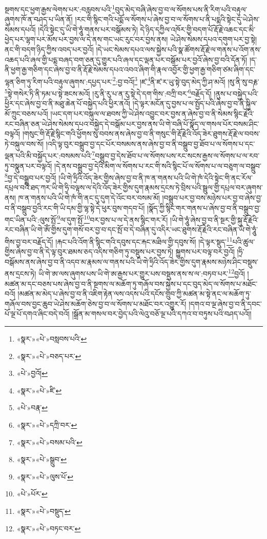 སྔགས་དང་ཕྱག་རྒྱས་ལེགས་པར་:བརླབས་པའི་\footnote{«སྣར་»«པེ་»བསླབས་པའི་}བུད་མེད་བཞི་ཞེས་བྱ་བ་ལ་སོགས་པས་ནི་རིག་པའི་བརྟུལ་ཞུགས་ཁོ་ན་བཤད་པ་ཡིན་ནོ། །རང་གི་སྙིང་གའི་པདྨོ་ལ་སོགས་པ་ཞེས་བྱ་བ་ལ་སོགས་པ་ནི་པདྨའི་སྟེང་དུ་ཡེ་ཤེས་སེམས་དཔའོ། །དེའི་སྟེང་དུ་ཡི་གེ་ཧཱུཾ་གནས་པར་བསྒོམས་ཏེ། དེ་ཉིད་དཀྱིལ་འཁོར་གྱི་བདག་པོ་རྡོ་རྗེ་འཆང་དང་མི་ཕྱེད་པར་ལྷག་པར་མོས་པར་བྱས་ལ་དེ་ནས་གང་ཡང་རུང་བར་བྱས་ནས། ཡེ་ཤེས་སེམས་དཔའ་དགུག་པར་བྱ་སྟེ། ནང་གི་བདག་ཉིད་ཀྱིས་འབད་པར་བྱའོ། །དེ་ཡང་སེམས་དཔའ་ལས་སྐྱེས་པའི་སྣ་ཚོགས་རྡོ་རྗེ་ལ་གནས་པ་འོག་ནས་འཆད་པའི་ཞལ་གྱི་པདྨ་བཞད་བག་ཅན་དུ་གྱུར་པའི་ཞལ་དང་ལྡན་པར་བསྒོམ་པར་བྱའོ་ཞེས་བྱ་བའི་དོན་ཏོ། །ད་ནི་ཕྱག་རྒྱ་གཅིག་དང་ཞེས་བྱ་བ་ནི་རྡོ་རྗེ་སེམས་དཔའ་འབའ་ཞིག་གི་རྣལ་འབྱོར་གྱི་ཕྱག་རྒྱ་གཅིག་ཙམ་ཞིག་དང་ལྷན་ཅིག་ཏུ་རིག་པའི་བརྟུལ་ཞུགས་:དཔྱད་པར་\footnote{«སྣར་»«པེ་»བཅད་པར་}:བྱ་བའོ།\footnote{«པེ་»བྱའོ།} །ཛ་\footnote{«སྣར་»«པེ་»ཛི་}ནི་ཛ་ར་ཡུ་སྟེ་བུད་མེད་ཀྱི་ཤ་མའོ། །སུ་ནི་སུ་བརྞ་\footnote{«པེ་»བརྣ་}སྟེ་གསེར་ཏི་ནི་ཏམ་པ་སྟེ་ཟངས་མའོ། །རུ་ནི་རུ་པ་ན་རུ་སྟེ་དེ་དག་གིས་:བཀྲི་བར་\footnote{«སྣར་»«པེ་»དཀྲི་བར་}བརྗོད་དོ། །ནུས་པ་བསྐྱེད་པའི་ཕྱིར་དང་ཞེས་བྱ་བ་ནི་མཐུ་ཆེན་པོ་བསྐྱེད་པའི་ཕྱིར་ནའོ། །དེ་ལྟར་མངོན་དུ་བྱས་པ་ལ་སྤྱོད་པའི་ཞེས་བྱ་བ་ནི་སྐྱིལ་མོ་ཀྲུང་བཅས་པའོ། །ཡང་དག་པར་བསྐུལ་ལ་ཐབས་ཀྱི་ཡེ་ཤེས་འབྱུང་བར་བྱས་ན་ཞེས་བྱ་བ་ནི་སེམས་སྙིང་རྗེའི་རང་བཞིན་ཅན་ཡེ་ཤེས་སེམས་དཔའ་བསྐྱེད་དེ་བསྒོམ་པར་བྱས་ནས་ཡི་གེ་བཞི་པོ་སྣོད་ལ་གསལ་པོར་བསམ་ཤིང་བལྟའོ། །གསུང་གི་རྡོ་རྗེ་སྙིང་གའི་ཕྱོགས་སུ་བབས་ནས་ཞེས་བྱ་བ་ནི་གསུང་གི་རྡོ་རྗེའི་འོད་ཟེར་ཐུགས་རྡོ་རྗེ་ལ་བབས་ཏེ་བསྐུལ་བས་སོ། །འདི་ལྟ་བུར་བསྒྲུབ་བྱ་དང་པོར་བསམས་ནས་ཞེས་བྱ་བ་ནི་བསྒྲུབ་བྱ་ཐོབ་པ་ལ་སོགས་པ་དང་ལྡན་པའི་མི་བསྐྱོད་པར་:བསམས་པའི་\footnote{«སྣར་»«པེ་»བསམ་པའི་}བསྒྲུབ་བྱ་དེས་ཐོབ་པ་ལ་སོགས་པས་རང་སངས་རྒྱས་ལ་སོགས་པ་ལ་རབ་ཏུ་བསྣུན་པར་བལྟའོ། །དེ་ནས་བསྒྲུབ་བྱ་དེའི་མིག་ལ་སོགས་པ་རང་གི་སའི་སྙིང་པོ་ལ་སོགས་པ་ལ་བཅུག་ལ་བསྒྲུབ་\footnote{«སྣར་»«པེ་»སྒྲུབ་}བྱ་དེ་བསྒྲུབ་པར་བྱའོ། །ཡི་གེ་ཧྲིའི་འོད་ཟེར་གྱིས་ཞེས་བྱ་བ་ནི་ཁ་ན་གནས་པའི་ཡི་གེ་ཁཾ་དེའི་སྟེང་གི་ནང་རོལ་དཔྲལ་བའི་ཐད་ཀར་ཡི་གེ་ཧྲི་བལྟས་ལ་དེའི་འོད་ཟེར་གྱིས་དུག་རྣམས་དྲངས་ཏེ་བྲིས་པའི་སྦྲུལ་གྱི་དཔྲལ་བར་ཞུགས་ནས། ཁ་ན་གནས་པའི་ཡི་གེ་ཁཾ་གི་ནང་དུ་དུག་དེ་འོང་བར་བསམ་མོ། །བསྒྲུབ་པར་བྱ་བས་མཉེས་པར་བྱ་བ་ཞེས་བྱ་བ་ནི་བསྒྲུབ་བྱའི་རང་གི་ཡི་དམ་གྱི་ལྷ་སྟེ་དེ་ཕུར་བུས་གདབ་པོ། །སྣོད་ཀྱི་སྙིང་གར་གནས་པ་ཞེས་བྱ་བ་ནི་བསྒྲུབ་བྱ་གང་ཡིན་པའི་:ལུས་སྤོ་\footnote{«སྣར་»«པེ་»ལུས་པོ་}ལ་དུག་སྤོ་\footnote{«པེ་»པོར་}བར་བྱས་པ་ལ་དེ་ནས་སྙིང་གར་རོ། །ཡི་གེ་ཧཱུཾ་ཞེས་བྱ་བ་ནི་སྔར་གྱི་སྐུ་རྡོ་རྗེའི་རང་བཞིན་ཡི་གེ་ཨོཾ་གྱིས་དུག་གསོ་བར་བྱ་བ་དང་སྤོ་བ་དེ་བཞིན་དུ་འདིར་ཡང་ཐུགས་རྡོ་རྗེའི་རང་བཞིན་ཡི་གེ་ཧཱུཾ་གིས་བྱ་བར་བརྗོད་དོ། །རྐང་པའི་འོག་ནི་སྙིང་གའི་དབུས་དང་རྐང་མཐིལ་གྱི་དབུས་སོ། །དེ་ལྟར་སྡུད་\footnote{«སྣར་»«པེ་»བསྡུད་}པའི་ཚུལ་གྱིས་ཞེས་བྱ་བ་ནི་དེ་ལྟ་བུར་ཐམས་ཅད་འདིས་གཅིག་ཏུ་བསྡུས་པར་བྱས་ཏེ། སྐྱུགས་པར་བལྟ་བར་བྱའོ། །ཧྲི་བསྒོམས་ནས་ཞེས་བྱ་བ་ནི་འདབ་མ་རྣམས་ལ་གནས་པའི་ཡི་གེ་ཧྲིའི་འོད་ཟེར་གྱིས་དུག་རྣམས་མཉེས་ཤིང་བསྡུས་ནས་དྲངས་ཏེ། ཡི་གེ་ཨ་ལས་ཞུགས་པས་ཡི་གེ་ཨ་རྒྱས་པར་གྱུར་པས་བསྡུས་ནས་ས་ལ་:བཏབ་པར་\footnote{«སྣར་»«པེ་»བཏང་བར་}བྱའོ། །མཚན་མ་དང་བཅས་པས་ཞེས་བྱ་བ་ནི་སྔགས་ལ་མཆོག་ཏུ་གཞོལ་བས་སྐྱེས་པ་དང་བུད་མེད་ལ་སོགས་པ་མཐོང་བའོ། །མཚན་མ་མེད་པ་ཞེས་བྱ་བ་ནི་འཇིག་རྟེན་ལས་འདས་པའི་དངོས་གྲུབ་ཀྱི་མཚན་མ་སྟེ་ནང་ལ་མཆོག་ཏུ་གཞོལ་བས་བྱང་ཆུབ་ཡེ་ཤེས་མཆོག་ཅེས་བྱ་བ་ལ་སོགས་པ་མཐོང་བར་འགྱུར་རོ། །དགའ་བ་ལྔ་ཞེས་བྱ་བ་ནི་དབང་པོ་ལྔ་པོ་དགའ་ཞིང་བདེ་བའོ། །སྒྲོན་མ་གསལ་བར་བྱེད་པའི་ལེའུ་བཅོ་ལྔ་པའི་དཀའ་བ་བཏུས་པའི་བཤད་པའོ།། 